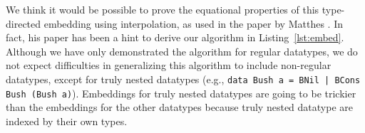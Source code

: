 We think it would be possible to prove the equational properties of
this type-directed embedding using interpolation, as used in the paper
by Matthes \cite{Matthes01a}. In fact, his paper has been a hint to derive
our algorithm in Listing~\ref{lst:embed}. Although we have only demonstrated
the algorithm for regular datatypes, we do not expect difficulties
in generalizing this algorithm to include non-regular datatypes, except for
truly nested datatypes
(e.g., \lstinline{data Bush a = BNil | BCons Bush (Bush a)}).
Embeddings for truly nested datatypes are going to be trickier than
the embeddings for the other datatypes because truly nested datatype
are indexed by their own types.

